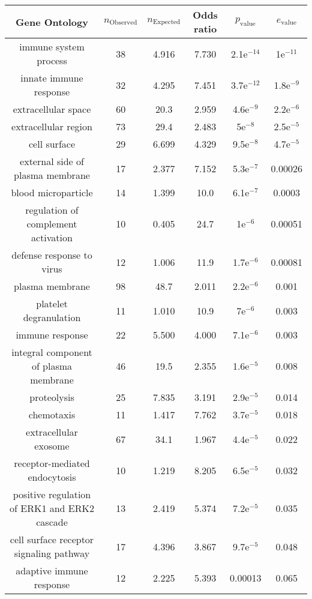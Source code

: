 \documentclass[USLetter,5pt]{article}
\begin{document}
\begin{table}[ht]
\centering
\begin{adjustbox}{width = 1\textwidth}
\small\begin{tabular}{|c|c|c|c|c|c|}
\hline
Gene Ontology & $n_{\mathrm{Observed}}$ & $n_{\mathrm{Expected}}$ & Odds ratio & $p_{\mathrm{value}}$ & $e_{\mathrm{value}}$\\
\hline
immune system process & 38 &  4.916 &  7.730 & 2.1e$^{-14}$ &  1e$^{-11}$\\
innate immune response & 32 &  4.295 &  7.451 & 3.7e$^{-12}$ & 1.8e$^{-9}$\\
extracellular space & 60 &   20.3 &  2.959 & 4.6e$^{-9}$ & 2.2e$^{-6}$\\
extracellular region & 73 &   29.4 &  2.483 &   5e$^{-8}$ & 2.5e$^{-5}$\\
cell surface & 29 &  6.699 &  4.329 & 9.5e$^{-8}$ & 4.7e$^{-5}$\\
external side of plasma membrane & 17 &  2.377 &  7.152 & 5.3e$^{-7}$ & 0.00026\\
blood microparticle & 14 &  1.399 &   10.0 & 6.1e$^{-7}$ & 0.0003\\
regulation of complement activation & 10 &  0.405 &   24.7 &   1e$^{-6}$ & 0.00051\\
defense response to virus & 12 &  1.006 &   11.9 & 1.7e$^{-6}$ & 0.00081\\
plasma membrane & 98 &   48.7 &  2.011 & 2.2e$^{-6}$ &  0.001\\
platelet degranulation & 11 &  1.010 &   10.9 &   7e$^{-6}$ &  0.003\\
immune response & 22 &  5.500 &  4.000 & 7.1e$^{-6}$ &  0.003\\
integral component of plasma membrane & 46 &   19.5 &  2.355 & 1.6e$^{-5}$ &  0.008\\
proteolysis & 25 &  7.835 &  3.191 & 2.9e$^{-5}$ &  0.014\\
chemotaxis & 11 &  1.417 &  7.762 & 3.7e$^{-5}$ &  0.018\\
extracellular exosome & 67 &   34.1 &  1.967 & 4.4e$^{-5}$ &  0.022\\
receptor-mediated endocytosis & 10 &  1.219 &  8.205 & 6.5e$^{-5}$ &  0.032\\
positive regulation of ERK1 and ERK2 cascade & 13 &  2.419 &  5.374 & 7.2e$^{-5}$ &  0.035\\
cell surface receptor signaling pathway & 17 &  4.396 &  3.867 & 9.7e$^{-5}$ &  0.048\\
adaptive immune response & 12 &  2.225 &  5.393 & 0.00013 &  0.065\\

\end{tabular}
\end{adjustbox}
\end{table}
\end{document}
